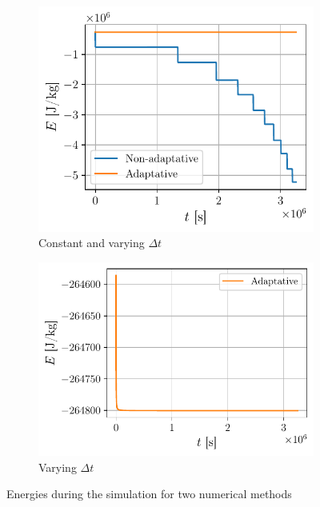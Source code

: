 \begin{figure}[h]
    \centering
    \begin{subfigure}{0.47\linewidth}
        \centering
        \includegraphics[width=\linewidth]{figures/transfert_all_energy.pdf}
        \caption{Constant and varying $\Delta t$}
        \label{fig:transfert_2_energies}
    \end{subfigure}
    \begin{subfigure}{0.52\linewidth}
        \centering
        \includegraphics[width=\linewidth]{figures/transfert_adapt_energy.pdf}
        \caption{Varying $\Delta t$}
        \label{fig:transfert_adapt_energy}
    \end{subfigure}
    \caption{Energies during the simulation for two numerical methods}
    \label{fig:transfert_energies}
\end{figure}

